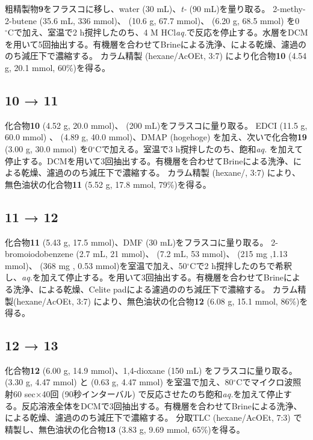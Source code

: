 \documentclass{ltjsarticle}
\theoremstyle{definition}
\numberwithin{equation}{section}
\newcommand{\D}{^\circ\text{C}}
\begin{document}
粗精製物\textbf{9}をフラスコに移し、water (30 mL)、\textit{t-} (90 mL)を量り取る。
2-methy-2-butene (35.6 mL, 336 mmol)、 (10.6 g, 67.7 mmol)、 (6.20 g, 68.5 mmol) を0$\D$で加え、室温で2 h撹拌したのち、4 M HCl\textit{aq.}で反応を停止する。水層をDCMを用いて5回抽出する。有機層を合わせてBrineによる洗浄、による乾燥、濾過ののち減圧下で濃縮する。
カラム精製 (hexane/AcOEt, 3:7) により化合物\textbf{10} (4.54 g, 20.1 mmol, 60\%)を得る。

\subsection{\textbf{10} → \textbf{11}}
化合物\textbf{10}  (4.52  g, 20.0 mmol)、 (200 mL)をフラスコに量り取る。
EDCI (11.5 g, 60.0 mmol) 、 (4.89 g, 40.0 mmol)、DMAP (hogehoge) を加え、次いで化合物\textbf{19} (3.00 g, 30.0 mmol) を0$\D$で加える。室温で3 h撹拌したのち、飽和\textit{aq.} を加えて停止する。DCMを用いて3回抽出する。有機層を合わせてBrineによる洗浄、による乾燥、濾過ののち減圧下で濃縮する。
カラム精製 (hexane/, 3:7) により、無色油状の化合物\textbf{11} (5.52 g, 17.8 mmol, 79\%)を得る。

\subsection{\textbf{11} → \textbf{12}}
化合物\textbf{11} (5.43  g, 17.5 mmol)、DMF (30 mL)をフラスコに量り取る。
2-bromoiodobenzene (2.7 mL, 21 mmol)、 (7.2 mL, 53 mmol)、 (215 mg ,1.13 mmol)、 (368 mg , 0.53 mmol)を室温で加え、50$\D$で2 h撹拌したのちで希釈し、\textit{aq.}を加えて停止する。を用いて3回抽出する。有機層を合わせてBrineによる洗浄、による乾燥、Celite padによる濾過ののち減圧下で濃縮する。
カラム精製(hexane/AcOEt, 3:7) により、無色油状の化合物\textbf{12} (6.08 g, 15.1 mmol, 86\%)を得る。

\subsection{\textbf{12} → \textbf{13}}
化合物\textbf{12} (6.00  g, 14.9 mmol)、1,4-dioxane (150 mL) をフラスコに量り取る。
 (3.30 g, 4.47 mmol) と  (0.63 g, 4.47 mmol) を室温で加え、80$\D$でマイクロ波照射60 sec$\times$40回 (90秒インターバル) で反応させたのち飽和\textit{aq.}を加えて停止する。反応溶液全体をDCMで3回抽出する。有機層を合わせてBrineによる洗浄、による乾燥、濾過ののち減圧下で濃縮する。
分取TLC (hexane/AcOEt, 7:3) で精製し、無色油状の化合物\textbf{13} (3.83 g, 9.69 mmol, 65\%)を得る。
\end{document}
